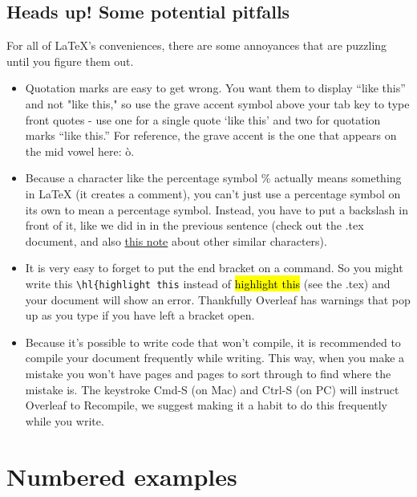 \documentclass[output=paper,colorlinks,citecolor=brown]{langscibook}
\begin{document}
\subsection{Heads up! Some potential pitfalls}

For all of \LaTeX{}'s conveniences, there are some annoyances that are puzzling until you figure them out. 

\begin{itemize}

    \item Quotation marks are easy to get wrong. You want them to display ``like this'' and not "like this," so use the grave accent symbol above your tab key to type front quotes - use one for a single quote `like this' and two for quotation marks ``like this.'' For reference, the grave accent is the one that appears on the mid vowel here: \`o.

    \item Because a character like the percentage symbol \% actually means something in \LaTeX{} (it creates a comment), you can't just use a percentage symbol on its own to mean a percentage symbol. Instead, you have to put a backslash in front of it, like we did in in the previous sentence (check out the .tex document, and also \href{http://ptmartins.info/latex/#special-characters}{this note} about other similar characters).
    
    \item It is very easy to forget to put the end bracket on a command. So you might write this \verb|\hl{highlight this| instead of \hl{highlight this} (see the .tex) and your document will show an error. Thankfully Overleaf has warnings that pop up as you type if you have left a bracket open.
    
    \item Because it's possible to write code that won't compile, it is recommended to compile your document frequently while writing. This way, when you make a mistake you won't have pages and pages to sort through to find where the mistake is. The keystroke Cmd-S (on Mac) and Ctrl-S (on PC) will instruct Overleaf to Recompile, we suggest making it a habit to do this frequently while you write. %

\end{itemize}

\section{Numbered examples} \label{sec:diercks:NumberedExs}
\end{document}
